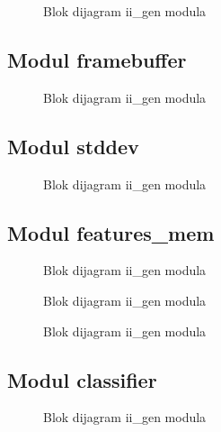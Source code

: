 \begin{figure}[H]
  \centering
  \scalebox{1.0}{
    
    }
\caption{Blok dijagram ii\_gen modula}
\label{ii\_gen}
\end{figure}

\subsection{Modul framebuffer}

\begin{figure}[H]
  \centering
  \scalebox{1.0}{
    
    }
\caption{Blok dijagram ii\_gen modula}
\label{ii\_gen}
\end{figure}

\subsection{Modul stddev}

\begin{figure}[H]
  \centering
  \scalebox{0.9}{
    
    }
\caption{Blok dijagram ii\_gen modula}
\label{ii\_gen}
\end{figure}

\subsection{Modul features\_mem}

\begin{figure}[H]
  \centering
    
\caption{Blok dijagram ii\_gen modula}
\label{ii\_gen}
\end{figure}

\begin{figure}[H]
  \centering
  \scalebox{0.8}{
    
    }
\caption{Blok dijagram ii\_gen modula}
\label{ii\_gen}
\end{figure}

\begin{figure}[H]
  \centering
  \scalebox{0.8}{
    
    }
\caption{Blok dijagram ii\_gen modula}
\label{ii\_gen}
\end{figure}

\subsection{Modul classifier}


\begin{figure}[H]
  \centering
  \scalebox{0.80}{
    
    }
\caption{Blok dijagram ii\_gen modula}
\label{ii\_gen}
\end{figure}
